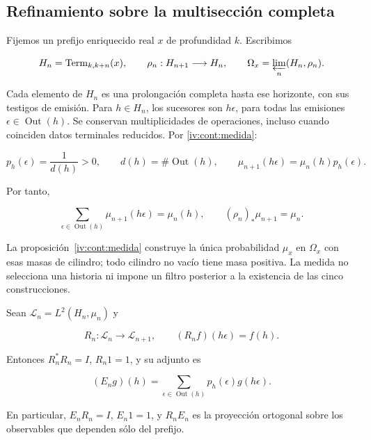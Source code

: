 \subsection{Refinamiento sobre la multisección completa}

Fijemos un prefijo enriquecido real \(x\) de profundidad \(k\). Escribimos

\[
H_n=\operatorname{Term}_{k,k+n}(x),\qquad
\rho_n:H_{n+1}\longrightarrow H_n,
\qquad \Omega_x=\varprojlim_n(H_n,\rho_n).
\]

Cada elemento de \(H_n\) es una prolongación completa hasta ese horizonte, con sus testigos de emisión. Para \(h\in H_n\), los sucesores son \(h\epsilon\), para todas las emisiones \(\epsilon\in\operatorname{Out}(h)\). Se conservan multiplicidades de operaciones, incluso cuando coinciden datos terminales reducidos. Por \cref{iv:cont:medida}:

\[
p_h(\epsilon)=\frac1{d(h)}>0,\qquad
d(h)=\#\operatorname{Out}(h),\qquad
\mu_{n+1}(h\epsilon)=\mu_n(h)p_h(\epsilon).
\]

Por tanto,

\begin{equation}
\sum_{\epsilon\in\operatorname{Out}(h)}\mu_{n+1}(h\epsilon)=\mu_n(h),
\qquad (\rho_n)_*\mu_{n+1}=\mu_n.
\label{nuc01:eq:1}
\end{equation}

La proposición~\ref{iv:cont:medida} construye la única probabilidad \(\mu_x\) en \(\Omega_x\) con esas masas de cilindro; todo cilindro no vacío tiene masa positiva. La medida no selecciona una historia ni impone un filtro posterior a la existencia de las cinco construcciones.

\begin{proposition}
\label{nuc01:pullback}

Sean \(\mathscr L_n=L^2(H_n,\mu_n)\) y

\[
R_n:\mathscr L_n\longrightarrow\mathscr L_{n+1},\qquad
(R_nf)(h\epsilon)=f(h).
\]

Entonces \(R_n^*R_n=I\), \(R_n1=1\), y su adjunto es

\begin{equation}
(E_ng)(h)=\sum_{\epsilon\in\operatorname{Out}(h)}p_h(\epsilon)g(h\epsilon).
\label{nuc01:eq:2}
\end{equation}

En particular, \(E_nR_n=I\), \(E_n1=1\), y \(R_nE_n\) es la proyección ortogonal sobre los observables que dependen sólo del prefijo.
\end{proposition}

